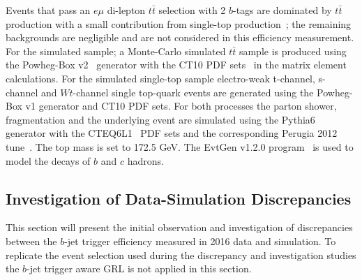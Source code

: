 Events that pass an $e\mu$ di-lepton $t\bar{t}$ selection with 2 $b$-tags
are dominated by $t\bar{t}$ production with a small contribution from single-top production~\cite{trig-ttbar};
the remaining backgrounds are negligible and are not considered in this efficiency measurement.
For the simulated sample; a Monte-Carlo simulated $t\bar{t}$ sample is produced using the
Powheg-Box v2~\cite{trig-powheg} generator with the CT10 PDF sets~\cite{trig-CT10} in the matrix element calculations.
For the simulated single-top sample electro-weak t-channel, s-channel and $Wt$-channel single top-quark events are generated using the Powheg-Box v1 generator and CT10 PDF sets.
For both processes the parton shower, fragmentation and the underlying event are simulated using the {\sc Pythia6}~\cite{trig-pythia6} generator with the CTEQ6L1~\cite{trig-CTEQ6L1} PDF sets
and the corresponding Perugia 2012 tune~\cite{trig-perugia}.
The top mass is set to 172.5 GeV.
The {\sc EvtGen} v1.2.0 program~\cite{trig-evtGen} is used to model the decays of $b$ and $c$ hadrons.

\subsection{Investigation of Data-Simulation Discrepancies}
\label{sec:trig-inv}

This section will present the initial observation and investigation of discrepancies between the $b$-jet trigger efficiency measured in 2016 data and simulation.
To replicate the event selection used during the discrepancy and investigation studies the $b$-jet trigger aware GRL is not applied in this section.


